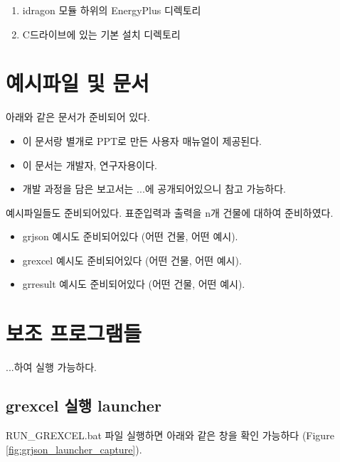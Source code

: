 \begin{enumerate}
  \item idragon 모듈 하위의 EnergyPlus 디렉토리
  \item C드라이브에 있는 기본 설치 디렉토리
\end{enumerate}


\section{예시파일 및 문서}

아래와 같은 문서가 준비되어 있다.
\begin{itemize}
  \item 이 문서랑 별개로 PPT로 만든 사용자 매뉴얼이 제공된다.
  \item 이 문서는 개발자, 연구자용이다.
  \item 개발 과정을 담은 보고서는 ...에 공개되어있으니 참고 가능하다.
\end{itemize}

예시파일들도 준비되어있다. 표준입력과 출력을 n개 건물에 대하여 준비하였다.
\begin{itemize}
  \item grjson   예시도 준비되어있다 (어떤 건물, 어떤 예시).
  \item grexcel  예시도 준비되어있다 (어떤 건물, 어떤 예시).
  \item grresult 예시도 준비되어있다 (어떤 건물, 어떤 예시).
\end{itemize}


\section{보조 프로그램들}
...하여 실행 가능하다.

\subsection{grexcel 실행 launcher}
RUN\_GREXCEL.bat 파일 실행하면 아래와 같은 창을 확인 가능하다 (Figure \ref{fig:grjson_launcher_capture}).

